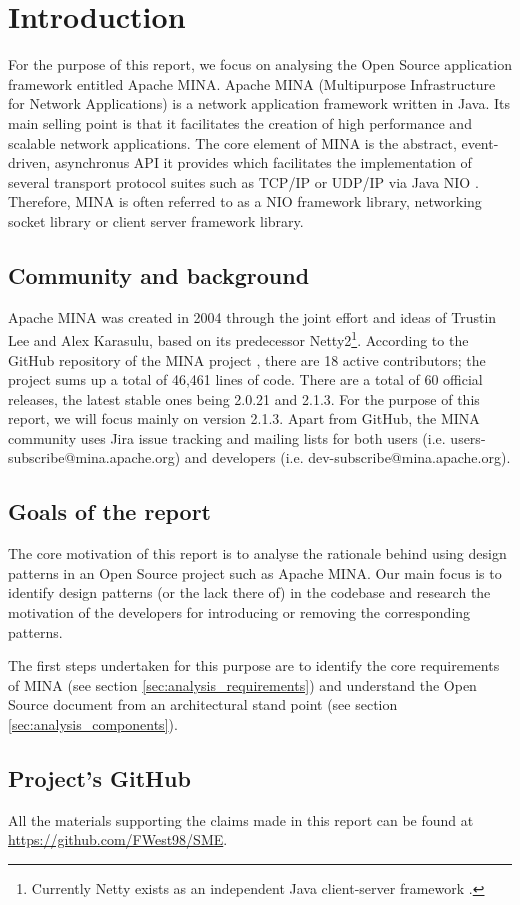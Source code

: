 \section{Introduction}
\label{sec:introduction}

For the purpose of this report, we focus on analysing the Open Source application framework entitled Apache MINA. Apache MINA (Multipurpose Infrastructure for Network Applications) \cite{mina-website} is a network application framework written in Java. Its main selling point is that it facilitates the creation of high performance and scalable network applications. The core element of MINA is the abstract, event-driven, asynchronus API it provides which facilitates the implementation of several transport protocol suites such as TCP/IP or UDP/IP via Java NIO \cite{oracle-nio}. Therefore, MINA is often referred to as a NIO framework library, networking socket library or client server framework library.

\subsection{Community and background}
Apache MINA was created in 2004 through the joint effort and ideas of Trustin Lee and Alex Karasulu, based on its predecessor Netty2\footnote{Currently Netty exists as an independent Java client-server framework \cite{netty}.}. According to the GitHub repository of the MINA project \cite{mina-github}, there are 18 active contributors; the project sums up a total of 46,461 lines of code. There are a total of 60 official releases, the latest stable ones being 2.0.21 and 2.1.3. For the purpose of this report, we will focus mainly on version 2.1.3. Apart from GitHub, the MINA community uses Jira issue tracking \cite{mina-jira} and mailing lists for both users (i.e. users-subscribe@mina.apache.org) and developers (i.e. dev-subscribe@mina.apache.org). 

\subsection{Goals of the report}
The core motivation of this report is to analyse the rationale behind using design patterns in an Open Source project such as Apache MINA. Our main focus is to identify design patterns (or the lack there of) in the codebase and research the motivation of the developers for introducing or removing the corresponding patterns.

The first steps undertaken for this purpose are to identify the core requirements of MINA (see section \ref{sec:analysis_requirements}) and understand the Open Source document from an architectural stand point (see section \ref{sec:analysis_components}).

\subsection{Project's GitHub}
All the materials supporting the claims made in this report can be found at \url{https://github.com/FWest98/SME}.
